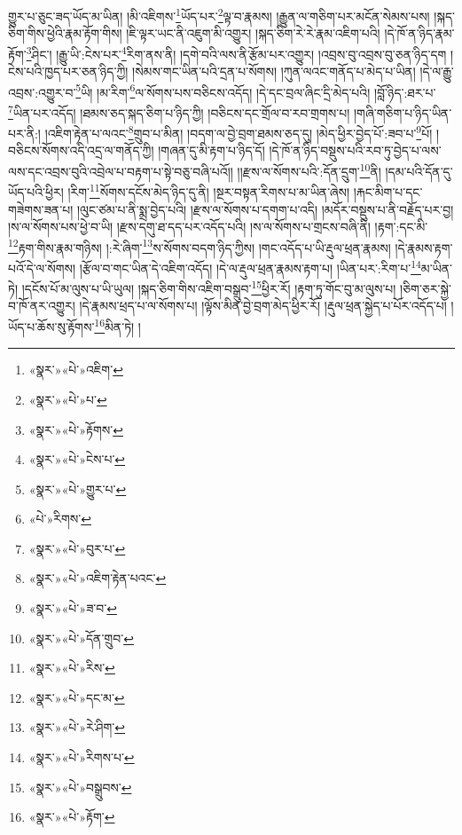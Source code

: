 གྱུར་པ་ཅུང་ཟད་ཡོད་མ་ཡིན། །མི་འཇིགས་\footnote{«སྣར་»«པེ་»འཇིག་}ཡོད་པར་\footnote{«སྣར་»«པེ་»པ་}ལྟ་བ་རྣམས། །རྒྱུན་ལ་གཅིག་པར་མངོན་སེམས་པས། །སྐད་ཅིག་གིས་ཕྱེའི་རྣམ་རྟོག་གིས། །ཇི་ལྟར་ཡང་ནི་འཇུག་མི་འགྱུར། །སྐད་ཅིག་རེ་རེ་རྣམ་འཇིག་པའི། །དེ་ཁོ་ན་ཉིད་རྣམ་རྟོག་\footnote{«སྣར་»«པེ་»རྟོགས་}ཤིང་། །རྒྱུ་ཡི་:ངེས་པར་\footnote{«སྣར་»«པེ་»ངེས་པ་}རིག་ནས་ནི། །དགེ་བའི་ལས་ནི་རྩོམ་པར་འགྱུར། །འབྲས་བུ་འབྲས་བུ་ཅན་ཉིད་དག །ངེས་པའི་ཁྱད་པར་ཅན་ཉིད་ཀྱི། །སེམས་གང་ཡིན་པའི་དྲན་པ་སོགས། །ཀུན་ལའང་གནོད་པ་མེད་པ་ཡིན། །དེ་ལ་རྒྱུ་འབྲས་:འགྱུར་བ་\footnote{«སྣར་»«པེ་»གྱུར་པ་}ཡི། །མ་རིག་\footnote{«པེ་»རིགས་}ལ་སོགས་པས་བཅིངས་འདོད། །དེ་དང་བྲལ་ཞིང་དྲི་མེད་པའི། །བློ་ཉིད་:ཐར་པ་\footnote{«སྣར་»«པེ་»བུར་པ་}ཡིན་པར་འདོད། །ཐམས་ཅད་སྐད་ཅིག་པ་ཉིད་ཀྱི། །བཅིངས་དང་གྲོལ་བ་རབ་གྲགས་པ། །གཞི་གཅིག་པ་ཉིད་ཡིན་པར་ནི:། །འཇིག་རྟེན་པ་ལའང་\footnote{«སྣར་»«པེ་»འཇིག་རྟེན་པའང་}གྲུབ་པ་མིན། །བདག་ལ་བྱེ་བྲག་ཐམས་ཅད་དུ། །མེད་ཕྱིར་བྱེད་པོ་:ཟབ་པ་\footnote{«སྣར་»«པེ་»ཟ་བ་}པོ། །བཅིངས་སོགས་འདི་འདྲ་ལ་གནོད་ཀྱི། །གཞན་དུ་མི་རྟག་པ་ཉིད་དོ། །དེ་ཁོ་ན་ཉིད་བསྡུས་པའི་རབ་ཏུ་བྱེད་པ་ལས་ལས་དང་འབྲས་བུའི་འབྲེལ་པ་བརྟག་པ་སྟེ་བཅུ་བཞི་པའོ།། །།རྫས་ལ་སོགས་པའི་:དོན་དྲུག་\footnote{«སྣར་»«པེ་»དོན་གྲུབ་}ནི། །དམ་པའི་དོན་དུ་ཡོད་པའི་ཕྱིར། །རིག་\footnote{«སྣར་»«པེ་»རིས་}སོགས་དངོས་མེད་ཉིད་དུ་ནི། །སྔར་བསྟན་རིགས་པ་མ་ཡིན་ཞེས། །རྐང་མིག་པ་དང་གཟེགས་ཟན་པ། །ལུང་ཙམ་པ་ནི་སྨྲ་བྱེད་པའི། །རྫས་ལ་སོགས་པ་དགག་པ་འདི། །མདོར་བསྡུས་པ་ནི་བརྗོད་པར་བྱ། །ས་ལ་སོགས་པས་ཕྱེ་བ་ཡི། །རྫས་དགུ་ཐ་དད་པར་འདོད་པའི། །ས་ལ་སོགས་པ་གྲངས་བཞི་ནི། །རྟག་:དང་མི་\footnote{«སྣར་»«པེ་»དང་མ་}རྟག་གིས་རྣམ་གཉིས། །:རེ་ཞིག་\footnote{«སྣར་»«པེ་»རེ་ཤིག་}ས་སོགས་བདག་ཉིད་ཀྱིས། །གང་འདོད་པ་ཡི་རྡུལ་ཕྲན་རྣམས། །དེ་རྣམས་རྟག་པའོ་དེ་ལ་སོགས། །རྩོལ་བ་གང་ཡིན་དེ་འཇིག་འདོད། །དེ་ལ་རྡུལ་ཕྲན་རྣམས་རྟག་པ། །ཡིན་པར་:རིག་པ་\footnote{«སྣར་»«པེ་»རིགས་པ་}མ་ཡིན་ཏེ། །དངོས་པོ་མ་ལུས་པ་ཡི་ཡུལ། །སྐད་ཅིག་གིས་འཇིག་བསྒྲུབ་\footnote{«སྣར་»«པེ་»བསྒྲུབས་}ཕྱིར་རོ། །རྟག་ཏུ་གོང་བུ་མ་ལུས་པ། །ཅིག་ཅར་སྐྱེ་བ་ཁོ་ནར་འགྱུར། །དེ་རྣམས་ཕྲད་པ་ལ་སོགས་པ། །ལྟོས་མིན་བྱེ་བྲག་མེད་ཕྱིར་རོ། །རྡུལ་ཕྲན་སྐྱེད་པ་པོར་འདོད་པ། །ཡོད་པ་ཆོས་སུ་རྟོགས་\footnote{«སྣར་»«པེ་»རྟོག་}མིན་ཏེ། །

